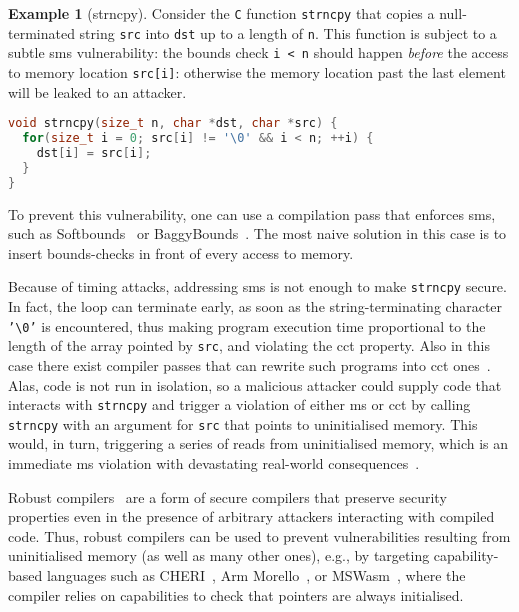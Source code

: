 \documentclass[dvipsnames,conference]{IEEEtran}
\theoremstyle{definition}
\newtheorem{exampleenv}{Example}[section]
\begin{document}
\begin{exampleenv}[strncpy]\label{ex:strncpy}
Consider the \texttt{C} function \texttt{strncpy} that copies a null-terminated string \texttt{src} into \texttt{dst} up to a length of \texttt{n}.
This function is subject to a subtle \gls*{sms} vulnerability: the bounds check \texttt{i < n} should happen {\it before} the access to memory location \texttt{src[i]}: otherwise
the memory location past the last element will be leaked to an attacker.
\begin{lstlisting}[language=c,basicstyle=\footnotesize\ttfamily,morekeywords={size_t}]
void strncpy(size_t n, char *dst, char *src) {
  for(size_t i = 0; src[i] != '\0' && i < n; ++i) {
    dst[i] = src[i];
  }
}
\end{lstlisting}

To prevent this vulnerability, one can use a compilation pass that enforces \gls*{sms}, such as Softbounds~\cite{nagarakatte2009soft} or BaggyBounds~\cite{akritidis2009baggy}.
The most naive solution in this case is to insert bounds-checks in front of every access to memory.

Because of timing attacks, addressing \gls*{sms} is not enough to make \texttt{strncpy} secure.
In fact, the loop can terminate early, as soon as the string-terminating character \texttt{'\textbackslash 0'} is encountered, thus making program execution time proportional to the length of the array pointed by \texttt{src}, and violating the \gls*{cct} property.
Also in this case there exist compiler passes that can rewrite such programs into \gls*{cct} ones~\cite{cauligi2019fact}.
%
Alas, code is not run in isolation, so a malicious attacker could supply code that interacts with \texttt{strncpy} and trigger a violation of either \gls*{ms} or \gls*{cct} by calling \texttt{strncpy} with an argument for \texttt{src} that points to uninitialised memory.
This would, in turn, triggering a series of reads from uninitialised memory, which is an immediate \gls*{ms} violation with devastating real-world consequences~\cite{uninit-0,uninit-1,uninit-2,uninit-3,uninit-4}.

Robust compilers~\cite{abate2019jour} are a form of secure compilers that preserve security properties even in the presence of arbitrary attackers interacting with compiled code.
Thus, robust compilers can be used to prevent vulnerabilities resulting from uninitialised memory (as well as many other ones), e.g., by targeting capability-based languages such as CHERI~\cite{woodruff2014CHERI}, Arm Morello~\cite{arm-morello}, or MSWasm~\cite{michael2023mswasm}, where the compiler relies on capabilities to check that pointers are always initialised.
\end{exampleenv}
\end{document}
